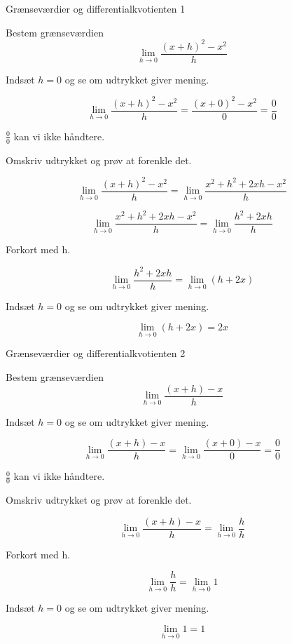 \documentclass{article}
\begin{document}
\tableofcontents
\newpage

\begin{exercise}{Grænseværdier og differentialkvotienten 1}

Bestem grænseværdien 
\[
\lim_{h \to 0} \frac{(x+h)^2-x^2}{h}
\]


\hint
Indsæt $h=0$ og se om udtrykket giver mening.

\hint
\[
\lim_{h \to 0} \frac{(x+h)^2-x^2}{h} = \frac{(x+0)^2-x^2}{0} = \frac{0}{0}
\]

\hint
$\frac{0}{0}$ kan vi ikke håndtere.

\hint
Omskriv udtrykket og prøv at forenkle det.

\hint
\[
\lim_{h \to 0} \frac{(x+h)^2-x^2}{h} = \lim_{h \to 0} \frac{x^2+h^2+2xh-x^2}{h}
\]

\hint
\[
\lim_{h \to 0} \frac{x^2+h^2+2xh-x^2}{h} = \lim_{h \to 0} \frac{h^2+2xh}{h}
\]

\hint
Forkort med h.

\hint
\[
\lim_{h \to 0} \frac{h^2+2xh}{h} = \lim_{h \to 0} (h + 2x)
\]

\hint
Indsæt $h=0$ og se om udtrykket giver mening.

\hint
\[
\lim_{h \to 0} (h + 2x) = 2x
\]

\end{exercise}

\newpage
\begin{exercise}{Grænseværdier og differentialkvotienten 2}
	
	Bestem grænseværdien 
	\[
	\lim_{h \to 0} \frac{(x+h)-x}{h}
	\]
	
	
	\hint
	Indsæt $h=0$ og se om udtrykket giver mening.
	
	\hint
	\[
	\lim_{h \to 0} \frac{(x+h)-x}{h}  =	\lim_{h \to 0} \frac{(x+0)-x}{0} = \frac{0}{0}
	\]
	
	\hint
	$\frac{0}{0}$ kan vi ikke håndtere.
	
	\hint
	Omskriv udtrykket og prøv at forenkle det.
	
	\hint
	\[
	\lim_{h \to 0} \frac{(x+h)-x}{h} = \lim_{h \to 0} \frac{h}{h}
	\]
	
	\hint
	Forkort med h.
	
	\hint
	\[
	\lim_{h \to 0} \frac{h}{h} = \lim_{h \to 0} 1 
	\]
	
	\hint
	Indsæt $h=0$ og se om udtrykket giver mening.
	
	\hint
	\[
	\lim_{h \to 0} 1  = 1
	\]
	
\end{exercise}
\end{document}
